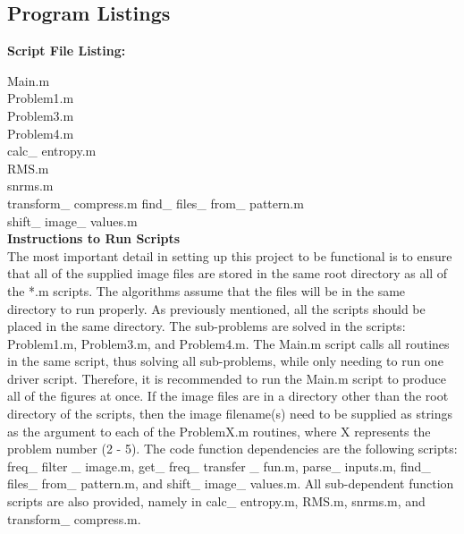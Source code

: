 \documentclass[./rarnold_project6.tex]{subfiles}
\begin{document}
\clearpage

\subsection*{Program Listings}

\noindent \textbf{Script File Listing:}

\noindent Main.m \\
Problem1.m \\
Problem3.m \\
Problem4.m \\
calc\_ entropy.m \\
RMS.m \\
snrms.m \\
transform\_ compress.m
find\_ files\_ from\_ pattern.m \\
shift\_ image\_ values.m \\


\noindent \textbf{Instructions to Run Scripts} \\

\noindent The most important detail in setting up this project to be functional is to ensure that all of the supplied image files are stored in the same root directory as all of the *.m scripts.  The algorithms assume that the files will be in the same directory to run properly.  As previously mentioned, all the scripts should be placed in the same directory.  The sub-problems are solved in the scripts: Problem1.m, Problem3.m, and Problem4.m.  The Main.m script calls all routines in the same script, thus solving all sub-problems, while only needing to run one driver script.  Therefore, it is recommended to run the Main.m script to produce all of the figures at once.  If the image files are in a directory other than the root directory of the scripts, then the image filename(s) need to be supplied as strings as the argument to each of the ProblemX.m routines, where X represents the problem number (2 - 5).  The code function dependencies are the following scripts: freq\_ filter \_ image.m, get\_ freq\_ transfer \_ fun.m, parse\_ inputs.m, find\_ files\_ from\_ pattern.m, and shift\_ image\_ values.m.  All sub-dependent function scripts are also provided, namely in calc\_ entropy.m, RMS.m, snrms.m, and transform\_ compress.m.
\end{document}
